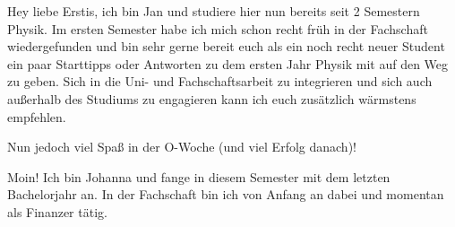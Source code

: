 \begin{multicols*}{2}
{Hey liebe Erstis, ich bin Jan und studiere hier nun bereits seit 2 Semestern Physik. Im ersten Semester habe ich mich schon recht früh in der Fachschaft wiedergefunden und bin sehr gerne bereit euch als ein noch recht neuer Student ein paar Starttipps oder Antworten zu dem ersten Jahr Physik mit auf den Weg zu geben. Sich in die Uni- und Fachschaftsarbeit zu integrieren und sich auch außerhalb des Studiums zu engagieren kann ich euch zusätzlich wärmstens empfehlen.

Nun jedoch viel Spaß in der O-Woche (und viel Erfolg danach)!
}

{Moin! Ich bin Johanna und fange in diesem Semester mit dem letzten Bachelorjahr an. In der Fachschaft bin ich von Anfang an dabei und momentan als Finanzer tätig.
\vspace{3\baselineskip}}


\end{multicols*}
